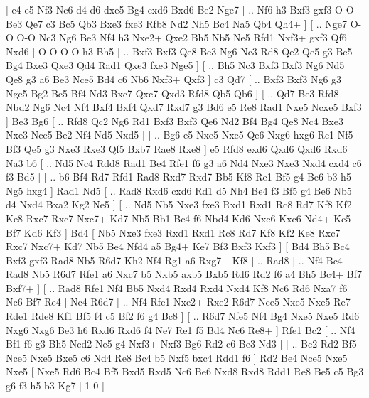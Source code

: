 \makegametitle 
|   e4   e5    Nf3   Nc6    d4   d6    dxe5   Bg4    exd6   Bxd6    Be2   Nge7 [ .. Nf6  h3 Bxf3  gxf3 O-O  Be3 Qe7  c3 Bc5  Qb3 Bxe3  fxe3 Rfb8  Nd2 Nh5  Bc4 Na5  Qb4 Qh4+   ]  [ .. Nge7  O-O O-O  Nc3 Ng6  Be3 Nf4  h3 Nxe2+  Qxe2 Bh5  Nb5 Ne5  Rfd1 Nxf3+  gxf3 Qf6  Nxd6   ]  O-O   O-O    h3   Bh5 [ .. Bxf3  Bxf3 Qe8  Be3 Ng6  Nc3 Rd8  Qe2 Qe5  g3 Bc5  Bg4 Bxe3  Qxe3 Qd4  Rad1 Qxe3  fxe3 Nge5   ]  [ .. Bh5  Nc3 Bxf3  Bxf3 Ng6  Nd5 Qe8  g3 a6  Be3 Nce5  Bd4 c6  Nb6 Nxf3+  Qxf3   ]  c3   Qd7 [ .. Bxf3  Bxf3 Ng6  g3 Nge5  Bg2 Bc5  Bf4 Nd3  Bxc7 Qxc7  Qxd3 Rfd8  Qb5 Qb6   ]  [ .. Qd7  Be3 Rfd8  Nbd2 Ng6  Nc4 Nf4  Bxf4 Bxf4  Qxd7 Rxd7  g3 Bd6  e5 Re8  Rad1 Nxe5  Ncxe5 Bxf3   ]  Be3   Bg6 [ .. Rfd8  Qc2 Ng6  Rd1 Bxf3  Bxf3 Qe6  Nd2 Bf4  Bg4 Qe8  Nc4 Bxe3  Nxe3 Nce5  Be2 Nf4  Nd5 Nxd5   ]  [ .. Bg6  e5 Nxe5  Nxe5 Qe6  Nxg6 hxg6  Re1 Nf5  Bf3 Qe5  g3 Nxe3  Rxe3 Qf5  Bxb7 Rae8  Rxe8   ]  e5   Rfd8    exd6   Qxd6    Qxd6   Rxd6    Na3   b6 [ .. Nd5  Nc4 Rdd8  Rad1 Be4  Rfe1 f6  g3 a6  Nd4 Nxe3  Nxe3 Nxd4  cxd4 c6  f3 Bd5   ]  [ .. b6  Bf4 Rd7  Rfd1 Rad8  Rxd7 Rxd7  Bb5 Kf8  Re1 Bf5  g4 Be6  b3 h5  Ng5 hxg4   ]  Rad1   Nd5 [ .. Rad8  Rxd6 cxd6  Rd1 d5  Nh4 Be4  f3 Bf5  g4 Be6  Nb5 d4  Nxd4 Bxa2  Kg2 Ne5   ]  [ .. Nd5  Nb5 Nxe3  fxe3 Rxd1  Rxd1 Rc8  Rd7 Kf8  Kf2 Ke8  Rxc7 Rxc7  Nxc7+ Kd7  Nb5 Bb1  Bc4 f6  Nbd4 Kd6  Nxc6 Kxc6  Nd4+ Kc5  Bf7 Kd6  Kf3   ]  Bd4 [  Nb5 Nxe3  fxe3 Rxd1  Rxd1 Rc8  Rd7 Kf8  Kf2 Ke8  Rxc7 Rxc7  Nxc7+ Kd7  Nb5 Be4  Nfd4 a5  Bg4+ Ke7  Bf3 Bxf3  Kxf3   ]  [  Bd4 Bh5  Bc4 Bxf3  gxf3 Rad8  Nb5 R6d7  Kh2 Nf4  Rg1 a6  Rxg7+ Kf8   ] .. Rad8 [ .. Nf4  Bc4 Rad8  Nb5 R6d7  Rfe1 a6  Nxc7 b5  Nxb5 axb5  Bxb5 Rd6  Rd2 f6  a4 Bh5  Bc4+ Bf7  Bxf7+   ]  [ .. Rad8  Rfe1 Nf4  Bb5 Nxd4  Rxd4 Rxd4  Nxd4 Kf8  Nc6 Rd6  Nxa7 f6  Nc6 Bf7  Re4   ]  Nc4   R6d7 [ .. Nf4  Rfe1 Nxe2+  Rxe2 R6d7  Nce5 Nxe5  Nxe5 Re7  Rde1 Rde8  Kf1 Bf5  f4 c5  Bf2 f6  g4 Bc8   ]  [ .. R6d7  Nfe5 Nf4  Bg4 Nxe5  Nxe5 Rd6  Nxg6 Nxg6  Be3 h6  Rxd6 Rxd6  f4 Ne7  Re1 f5  Bd4 Nc6  Re8+   ]  Rfe1   Bc2 [ .. Nf4  Bf1 f6  g3 Bh5  Ncd2 Ne5  g4 Nxf3+  Nxf3 Bg6  Rd2 c6  Be3 Nd3   ]  [ .. Bc2  Rd2 Bf5  Nce5 Nxe5  Bxe5 c6  Nd4 Re8  Bc4 b5  Nxf5 bxc4  Rdd1 f6   ]  Rd2   Be4    Nce5   Nxe5    Nxe5    [  Nxe5 Rd6  Bc4 Bf5  Bxd5 Rxd5  Nc6 Be6  Nxd8 Rxd8  Rdd1 Re8  Be5 c5  Bg3 g6  f3 h5  b3 Kg7   ] 1-0  |
